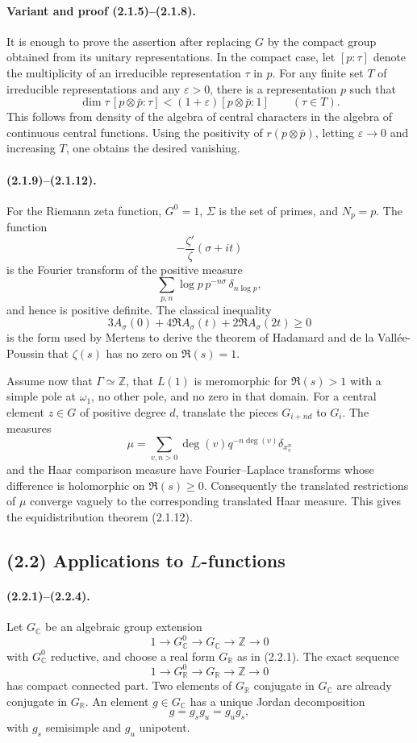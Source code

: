 \documentclass[11pt]{article}
\theoremstyle{remark}
\newcommand{\ZZ}{\mathbb{Z}}
\newcommand{\CC}{\mathbb{C}}
\newcommand{\RR}{\mathbb{R}}
\begin{document}
\paragraph{Variant and proof (2.1.5)--(2.1.8).}
It is enough to prove the assertion after replacing \(G\) by the compact group obtained from its unitary representations. In the compact case, let \([p:\tau]\) denote the multiplicity of an irreducible representation \(\tau\) in \(p\). For any finite set \(T\) of irreducible representations and any \(\varepsilon>0\), there is a representation \(p\) such that
\[
\dim \tau\,[p\otimes\bar p:\tau]<(1+\varepsilon)[p\otimes\bar p:1]
\qquad(\tau\in T).
\]
This follows from density of the algebra of central characters in the algebra of continuous central functions. Using the positivity of \(r(p\otimes\bar p)\), letting \(\varepsilon\to0\) and increasing \(T\), one obtains the desired vanishing.

\paragraph{(2.1.9)--(2.1.12).}
For the Riemann zeta function, \(G^0=1\), \(\Sigma\) is the set of primes, and \(N_p=p\). The function
\[
-\frac{\zeta'}{\zeta}(\sigma+it)
\]
is the Fourier transform of the positive measure
\[
\sum_{p,n}\log p\,p^{-n\sigma}\,\delta_{n\log p},
\]
and hence is positive definite. The classical inequality
\[
3A_\sigma(0)+4\Re A_\sigma(t)+2\Re A_\sigma(2t)\ge0
\]
is the form used by Mertens to derive the theorem of Hadamard and de la Vallée-Poussin that \(\zeta(s)\) has no zero on \(\Re(s)=1\).

Assume now that \(\Gamma\simeq\ZZ\), that \(L(1)\) is meromorphic for \(\Re(s)>1\) with a simple pole at \(\omega_1\), no other pole, and no zero in that domain. For a central element \(z\in G\) of positive degree \(d\), translate the pieces \(G_{i+nd}\) to \(G_i\). The measures
\[
\mu=\sum_{v,n>0}\deg(v)q^{-n\deg(v)}\delta_{x_v^n}
\]
and the Haar comparison measure have Fourier--Laplace transforms whose difference is holomorphic on \(\Re(s)\ge0\). Consequently the translated restrictions of \(\mu\) converge vaguely to the corresponding translated Haar measure. This gives the equidistribution theorem (2.1.12).

\subsection*{(2.2) Applications to \(L\)-functions}

\paragraph{(2.2.1)--(2.2.4).}
Let \(G_\CC\) be an algebraic group extension
\[
1\longrightarrow G^0_\CC\longrightarrow G_\CC\longrightarrow \ZZ\longrightarrow 0
\]
with \(G^0_\CC\) reductive, and choose a real form \(G_\RR\) as in (2.2.1). The exact sequence
\[
1\longrightarrow G^0_\RR\longrightarrow G_\RR\longrightarrow \ZZ\longrightarrow 0
\]
has compact connected part. Two elements of \(G_\RR\) conjugate in \(G_\CC\) are already conjugate in \(G_\RR\). An element \(g\in G_\CC\) has a unique Jordan decomposition
\[
g=g_sg_u=g_ug_s,
\]
with \(g_s\) semisimple and \(g_u\) unipotent.
\end{document}
